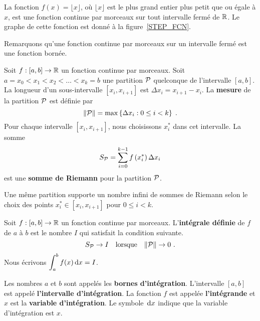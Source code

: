 {\begin{egg}
La fonction $f(x) = \lfloor x \rfloor$, où $\lfloor x \rfloor$ est le
plus grand entier plus petit que ou égale à $x$, est une fonction
continue par morceaux sur tout intervalle fermé de $\mathbb{R}$.  Le graphe
de cette fonction est donné à la figure~\ref{STEP_FCN}.
\end{egg}


Remarquons qu'une fonction continue par morceaux sur un intervalle
fermé est une fonction bornée.

\begin{defn} 
Soit $f:[a,b]\rightarrow \mathbb{R}$ un fonction continue par morceaux.  Soit
$a=x_0 < x_1 < x_2 < \ldots < x_k = b$ une partition ${\cal P}$
quelconque de l'intervalle $[a,b]$.  La longueur d'un sous-intervalle
$[x_i,x_{i+1}]$ est $\Delta x_i = x_{i+1}-x_i$.
La {\bfseries mesure} de la partition $\cal P$ est définie par
\[
\| {\cal P} \| = \max \left\{ \Delta x_i : 0\leq i < k \right\} \; .
\]
Pour chaque intervalle $[x_i,x_{i+1}]$, nous choisissons $x_i^\ast$ dans cet
intervalle.  La somme
\[
S_{\cal P} = \sum_{i=0}^{k-1} f\left(x_i^\ast\right) \Delta x_i
\]
est une {\bfseries somme de Riemann} pour la partition ${\cal P}$.
\end{defn}

Une même partition supporte un nombre infini de sommes de Riemann
selon le choix des points $x_i^\ast \in [x_i, x_{i+1}]$ pour
$0\leq i <k$.

\begin{defn} \label{def_non_rig}
Soit $f:[a,b]\rightarrow \mathbb{R}$ un fonction continue par morceaux.
L'{\bfseries intégrale définie} de $f$ de $a$
à $b$ est le nombre $I$ qui satisfait la condition suivante.
\[
S_{\cal P} \rightarrow I \quad \text{lorsque}
\quad \|{\cal P}\|\rightarrow 0 \ .
\]
Nous écrivons $\displaystyle \displaystyle \int_a^b f(x) \,\mathrm{d}x = I$.

Les nombres $a$ et $b$ sont appelés les
{\bfseries bornes d'intégration}.
L'intervalle $[a,b]$ est appelé
{\bfseries l'intervalle d'intégration}. 
La fonction $f$ est appelée {\bfseries l'intégrande}
et $x$ est la
{\bfseries variable d'intégration}.  Le
symbole $\,\mathrm{d}x$ indique que la variable d'intégration est $x$.
\end{defn}

}
